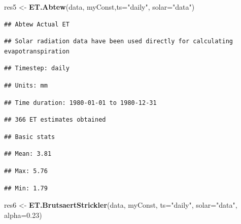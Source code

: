\documentclass[
]{book}
\newenvironment{Shaded}{\begin{snugshade}}{\end{snugshade}}
\newcommand{\DataTypeTok}[1]{\textcolor[rgb]{0.13,0.29,0.53}{#1}}
\newcommand{\FloatTok}[1]{\textcolor[rgb]{0.00,0.00,0.81}{#1}}
\newcommand{\KeywordTok}[1]{\textcolor[rgb]{0.13,0.29,0.53}{\textbf{#1}}}
\newcommand{\NormalTok}[1]{#1}
\newcommand{\StringTok}[1]{\textcolor[rgb]{0.31,0.60,0.02}{#1}}
\begin{document}
\begin{Shaded}
\begin{Highlighting}[]
\NormalTok{res5 <-}\StringTok{ }\KeywordTok{ET.Abtew}\NormalTok{(data, myConst,}\DataTypeTok{ts=}\StringTok{"daily"}\NormalTok{, }\DataTypeTok{solar=}\StringTok{"data"}\NormalTok{)}
\end{Highlighting}
\end{Shaded}

\begin{verbatim}
## Abtew Actual ET
\end{verbatim}

\begin{verbatim}
## Solar radiation data have been used directly for calculating evapotranspiration
\end{verbatim}

\begin{verbatim}
## Timestep: daily
\end{verbatim}

\begin{verbatim}
## Units: mm
\end{verbatim}

\begin{verbatim}
## Time duration: 1980-01-01 to 1980-12-31
\end{verbatim}

\begin{verbatim}
## 366 ET estimates obtained
\end{verbatim}

\begin{verbatim}
## Basic stats
\end{verbatim}

\begin{verbatim}
## Mean: 3.81
\end{verbatim}

\begin{verbatim}
## Max: 5.76
\end{verbatim}

\begin{verbatim}
## Min: 1.79
\end{verbatim}

\begin{Shaded}
\begin{Highlighting}[]
\NormalTok{res6 <-}\StringTok{ }\KeywordTok{ET.BrutsaertStrickler}\NormalTok{(data, myConst, }\DataTypeTok{ts=}\StringTok{"daily"}\NormalTok{, }\DataTypeTok{solar=}\StringTok{"data"}\NormalTok{, }\DataTypeTok{alpha=}\FloatTok{0.23}\NormalTok{)}
\end{Highlighting}
\end{Shaded}
\end{document}
